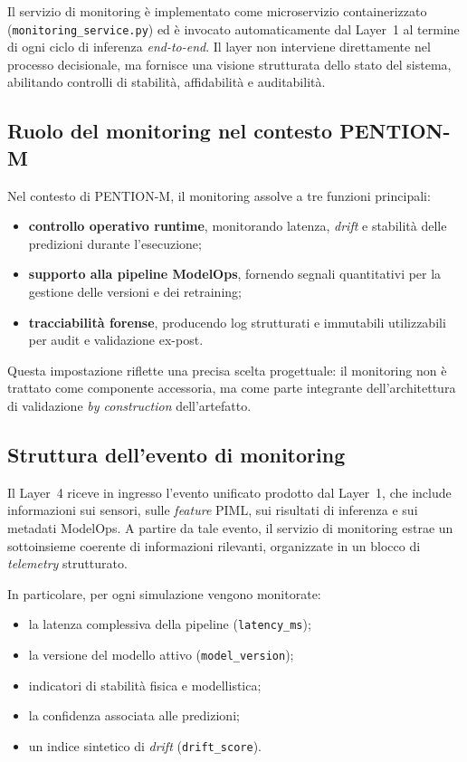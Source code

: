 Il servizio di monitoring è implementato come microservizio containerizzato (\texttt{monitoring\_service.py}) ed è invocato automaticamente dal Layer~1 al termine di ogni ciclo di inferenza \textit{end-to-end}.
Il layer non interviene direttamente nel processo decisionale, ma fornisce una visione strutturata dello stato del sistema, abilitando controlli di stabilità, affidabilità e auditabilità.

\subsection{Ruolo del monitoring nel contesto PENTION-M}

Nel contesto di \textsc{PENTION-M}, il monitoring assolve a tre funzioni principali:
\begin{itemize}
	\item \textbf{controllo operativo runtime}, monitorando latenza, \textit{drift} e stabilità delle predizioni durante l’esecuzione;
	\item \textbf{supporto alla pipeline ModelOps}, fornendo segnali quantitativi per la gestione delle versioni e dei retraining;
	\item \textbf{tracciabilità forense}, producendo log strutturati e immutabili utilizzabili per audit e validazione ex-post.
\end{itemize}

Questa impostazione riflette una precisa scelta progettuale: il monitoring non è trattato come componente accessoria, ma come parte integrante dell’architettura di validazione \emph{by construction} dell’artefatto.

\subsection{Struttura dell’evento di monitoring}

Il Layer~4 riceve in ingresso l’evento unificato prodotto dal Layer~1, che include informazioni sui sensori, sulle \textit{feature} PIML, sui risultati di inferenza e sui metadati ModelOps.
A partire da tale evento, il servizio di monitoring estrae un sottoinsieme coerente di informazioni rilevanti, organizzate in un blocco di \textit{telemetry} strutturato.

In particolare, per ogni simulazione vengono monitorate:
\begin{itemize}
	\item la latenza complessiva della pipeline (\texttt{latency\_ms});
	\item la versione del modello attivo (\texttt{model\_version});
	\item indicatori di stabilità fisica e modellistica;
	\item la confidenza associata alle predizioni;
	\item un indice sintetico di \textit{drift} (\texttt{drift\_score}).
\end{itemize}

